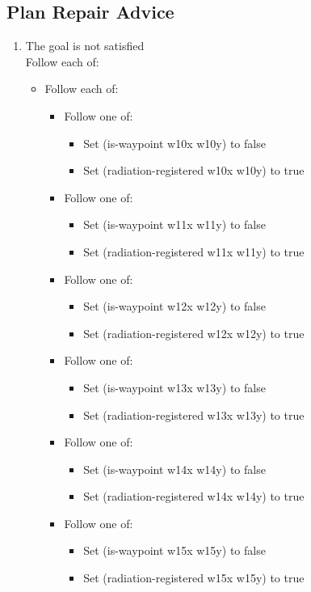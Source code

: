 \documentclass[a4paper,12pt]{article}
\newcommand{\exprn}[1]{{\sf #1}}
\begin{document}
\subsection{Plan Repair Advice}
\begin{enumerate}
\item The goal is not satisfied\\
Follow each of:
\begin{itemize}\item Follow each of:
\begin{itemize}\item Follow one of:
\begin{itemize}\item Set \exprn{(is-waypoint w10x w10y)} to false
\item Set \exprn{(radiation-registered w10x w10y)} to true
\end{itemize}\item Follow one of:
\begin{itemize}\item Set \exprn{(is-waypoint w11x w11y)} to false
\item Set \exprn{(radiation-registered w11x w11y)} to true
\end{itemize}\item Follow one of:
\begin{itemize}\item Set \exprn{(is-waypoint w12x w12y)} to false
\item Set \exprn{(radiation-registered w12x w12y)} to true
\end{itemize}\item Follow one of:
\begin{itemize}\item Set \exprn{(is-waypoint w13x w13y)} to false
\item Set \exprn{(radiation-registered w13x w13y)} to true
\end{itemize}\item Follow one of:
\begin{itemize}\item Set \exprn{(is-waypoint w14x w14y)} to false
\item Set \exprn{(radiation-registered w14x w14y)} to true
\end{itemize}\item Follow one of:
\begin{itemize}\item Set \exprn{(is-waypoint w15x w15y)} to false
\item Set \exprn{(radiation-registered w15x w15y)} to true

\end{itemize}
\end{itemize}
\end{itemize}
\end{enumerate}
\end{document}
